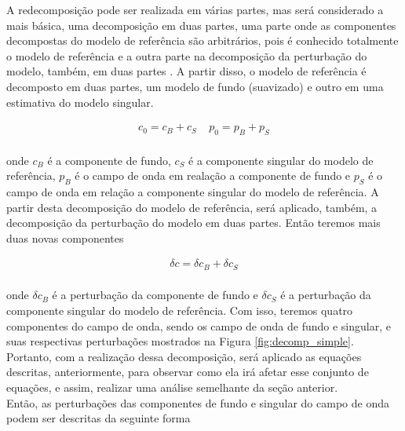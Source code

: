 A redecomposição pode ser realizada em várias partes, mas será considerado a mais básica, uma decomposição em duas partes, uma parte onde as componentes decompostas do modelo de referência são arbitrários, pois é conhecido totalmente o modelo de referência e a outra parte na decomposição da perturbação do modelo, também, em duas partes . A partir disso, o modelo de referência é decomposto em duas partes, um modelo de fundo (suavizado) e outro em uma estimativa do modelo singular. 

\begin{eqnarray}
 c_{0} = c_{B} + c_{S} ~~~~~ p_{0} = p_{B} + p_{S}
\end{eqnarray}
\\
onde $c_{B}$ é a componente de fundo, $c_{S}$ é a componente singular do modelo de referência, $p_{B}$ é o campo de onda em realação a componente de fundo e $p_{S}$ é o campo de onda em relação a componente singular do modelo de referência. A partir desta decomposição do modelo de referência, será aplicado, também, a decomposição da perturbação do modelo  em duas partes. Então teremos mais duas novas componentes 

\begin{eqnarray}
  \delta c = \delta c_{B} + \delta c_{S}
\end{eqnarray}
\\
onde $\delta c_{B}$ é a perturbação da componente de fundo e $\delta c_{S}$ é a perturbação da componente singular do modelo de referência. Com isso, teremos quatro componentes do campo de onda, sendo os campo de onda de fundo e singular, e suas respectivas perturbações mostrados na Figura \ref{fig:decomp_simple}. Portanto,  com a realização dessa decomposição, será aplicado as equações descritas, anteriormente, para observar como ela irá afetar esse conjunto de equações, e assim, realizar uma análise semelhante da seção anterior. \\

Então, as perturbações das componentes de fundo e singular do campo de onda podem ser descritas da seguinte forma \\

